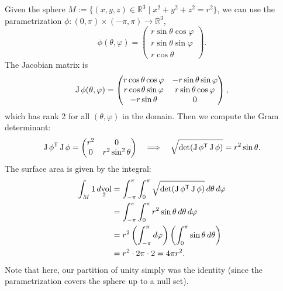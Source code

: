 \begin{example}
\label{ex:surface_area_sphere}
Given the sphere $M := \{(x,y,z) \in \mathbb{R}^3 \mid x^2+y^2+z^2 = r^2\}$, we can use the parametrization $\phi : (0,\pi) \times (-\pi,\pi) \to \mathbb{R}^3$,
\[\phi(\theta,\varphi) = \begin{pmatrix} r\sin\theta\cos\varphi \\ r\sin\theta\sin\varphi \\ r\cos\theta \end{pmatrix}.\]
The Jacobian matrix is
\[\operatorname{J}\phi(\theta,\varphi) = \begin{pmatrix} r\cos\theta\cos\varphi & -r\sin\theta\sin\varphi \\ r\cos\theta\sin\varphi & r\sin\theta\cos\varphi \\ -r\sin\theta & 0 \end{pmatrix},\]
which has rank 2 for all $(\theta,\varphi)$ in the domain.
Then we compute the Gram determinant:
\[\operatorname{J}\phi^{\mathsf{T}} \operatorname{J}\phi = \begin{pmatrix} r^2 & 0 \\ 0 & r^2\sin^2\theta \end{pmatrix} \quad \Longrightarrow \quad \sqrt{\det(\operatorname{J}\phi^{\mathsf{T}} \operatorname{J}\phi)} = r^2\sin\theta.\]
The surface area is given by the integral:
\begin{align*}
\int_M 1 \mathop{d\text{vol}}_2 &= \int_{-\pi}^\pi \int_0^\pi \sqrt{\det(\operatorname{J}\phi^{\mathsf{T}} \operatorname{J}\phi)} \,d\theta\,d\varphi \\
&= \int_{-\pi}^\pi \int_0^\pi r^2\sin\theta \,d\theta\,d\varphi \\
&= r^2 \left(\int_{-\pi}^\pi d\varphi\right) \left(\int_0^\pi \sin\theta \,d\theta\right) \\
&= r^2 \cdot 2\pi \cdot 2 = 4\pi r^2.
\end{align*}
Note that here, our partition of unity simply was the identity (since the parametrization covers the sphere up to a null set).

\begin{center}
\end{center}
\end{example}
